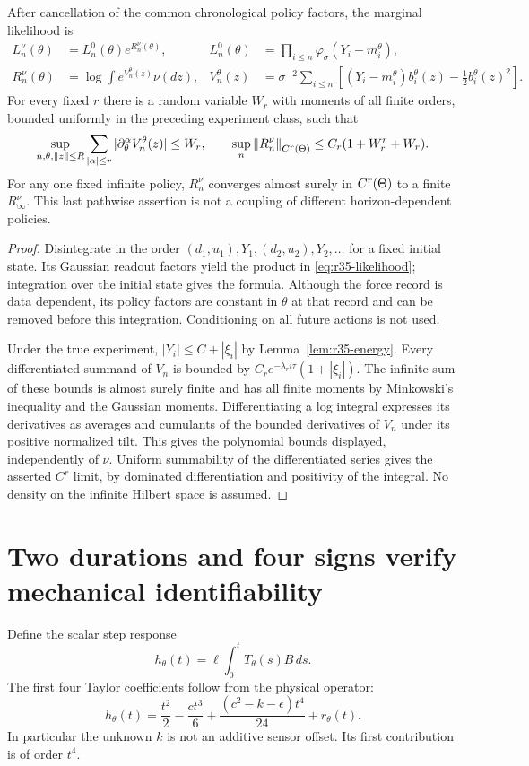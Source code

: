 \begin{proposition}\label{prop:r35-nuisance}
After cancellation of the common chronological policy factors, the marginal likelihood is
\begin{align}
 L_n^\nu(\theta)&=L_n^0(\theta)e^{R_n^\nu(\theta)},&
 L_n^0(\theta)&=\prod_{i\le n}\varphi_\sigma(Y_i-m_i^\theta),\label{eq:r35-likelihood}\\
 R_n^\nu(\theta)&=\log\int e^{V_n^\theta(z)}\nu(dz),&
 V_n^\theta(z)&=\sigma^{-2}\sum_{i\le n}
 \left[(Y_i-m_i^\theta)b_i^\theta(z)-\tfrac12 b_i^\theta(z)^2\right].\nonumber
\end{align}
For every fixed $r$ there is a random variable $W_r$ with moments of all finite orders, bounded uniformly in the preceding experiment class, such that
\[
 \sup_{n,\theta,\left\|z\right\|\le R}\sum_{|\alpha|\le r}
 |\partial_\theta^\alpha V_n^\theta(z)|\le W_r,
 \qquad \sup_n\left\|R_n^\nu\right\|_{C^r(\Theta)}\le C_r(1+W_r^r+W_r).
\]
For any one fixed infinite policy, $R_n^\nu$ converges almost surely in $C^r(\Theta)$ to a finite $R_\infty^\nu$. This last pathwise assertion is not a coupling of different horizon-dependent policies.
\end{proposition}
\begin{proof}
Disintegrate in the order $(d_1,u_1),Y_1,(d_2,u_2),Y_2,\ldots$ for a fixed initial state. Its Gaussian readout factors yield the product in \eqref{eq:r35-likelihood}; integration over the initial state gives the formula. Although the force record is data dependent, its policy factors are constant in $\theta$ at that record and can be removed before this integration. Conditioning on all future actions is not used.

Under the true experiment, $|Y_i|\le C+|\xi_i|$ by Lemma~\ref{lem:r35-energy}. Every differentiated summand of $V_n$ is bounded by
$C_r e^{-\lambda_r i\tau}(1+|\xi_i|)$. The infinite sum of these bounds is almost surely finite and has all finite moments by Minkowski's inequality and the Gaussian moments. Differentiating a log integral expresses its derivatives as averages and cumulants of the bounded derivatives of $V_n$ under its positive normalized tilt. This gives the polynomial bounds displayed, independently of $\nu$. Uniform summability of the differentiated series gives the asserted $C^r$ limit, by dominated differentiation and positivity of the integral. No density on the infinite Hilbert space is assumed.
\end{proof}

\section{Two durations and four signs verify mechanical identifiability}
\label{sec:r35-words}
Define the scalar step response
\[
 h_\theta(t)=\ell\int_0^tT_\theta(s)B\,ds.
\]
The first four Taylor coefficients follow from the physical operator:
\begin{equation}\label{eq:r35-step}
 h_\theta(t)=\frac{t^2}{2}-\frac{ct^3}{6}
             +\frac{(c^2-k-\epsilon)t^4}{24}+r_\theta(t).
\end{equation}
In particular the unknown $k$ is not an additive sensor offset. Its first contribution is of order $t^4$.


